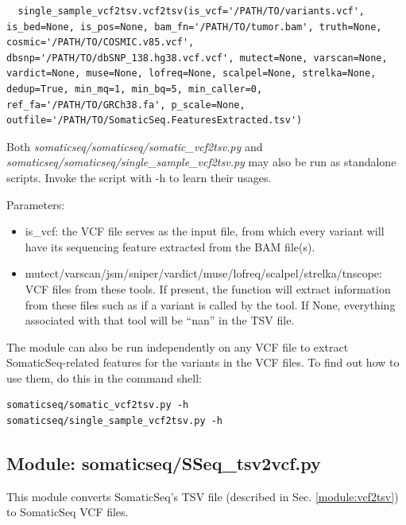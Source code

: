 \documentclass[10pt,letterpaper]{article}
\begin{document}
\begin{sloppypar}
\begin{lstlisting}
  single_sample_vcf2tsv.vcf2tsv(is_vcf='/PATH/TO/variants.vcf', is_bed=None, is_pos=None, bam_fn='/PATH/TO/tumor.bam', truth=None, cosmic='/PATH/TO/COSMIC.v85.vcf', dbsnp='/PATH/TO/dbSNP_138.hg38.vcf.vcf', mutect=None, varscan=None, vardict=None, muse=None, lofreq=None, scalpel=None, strelka=None, dedup=True, min_mq=1, min_bq=5, min_caller=0, ref_fa='/PATH/TO/GRCh38.fa', p_scale=None, outfile='/PATH/TO/SomaticSeq.FeaturesExtracted.tsv')
\end{lstlisting}

Both \textit{somaticseq/somaticseq/somatic\_vcf2tsv.py} and \textit{somaticseq/somaticseq/single\_sample\_vcf2tsv.py} may also be run as standalone scripts. Invoke the script with -h to learn their usages. 


Parameters:

\begin{itemize}

\item is\_vcf: the VCF file serves as the input file, from which every variant will have its sequencing feature extracted from the BAM file(s). 

\item mutect/varscan/jsm/sniper/vardict/muse/lofreq/scalpel/strelka/tnscope: VCF files from these tools. If present, the function will extract information from these files such as if a variant is called by the tool. If None, everything associated with that tool will be ``nan'' in the TSV file.

\end{itemize}


The module can also be run independently on any VCF file to extract SomaticSeq-related features for the variants in the VCF files. To find out how to use them, do this in the command shell: 

\begin{lstlisting}
somaticseq/somatic_vcf2tsv.py -h
somaticseq/single_sample_vcf2tsv.py -h
\end{lstlisting}







\subsection{Module: somaticseq/SSeq\_tsv2vcf.py} \label{module:tsv2vcf}

This module converts SomaticSeq's TSV file (described in Sec. \ref{module:vcf2tsv}) to SomaticSeq VCF files.



\end{sloppypar}
\end{document}
